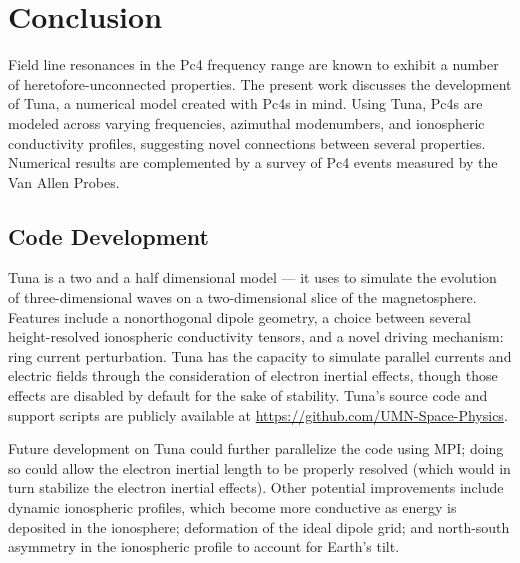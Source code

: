 


\chapter{Conclusion}
  \label{ch_conclusion}

Field line resonances in the Pc4 frequency range are known to exhibit a number
of heretofore-unconnected properties. The present work discusses the
development of Tuna, a numerical model created with Pc4s in mind. Using Tuna,
Pc4s are modeled across varying frequencies, azimuthal
modenumbers, and ionospheric conductivity profiles, suggesting novel
connections between several properties. Numerical results are complemented by a
survey of Pc4 events measured by the Van Allen Probes. 

\section{Code Development}

Tuna is a two and a half dimensional model --- it uses \maxeqs to simulate the
evolution of three-dimensional \Alfven waves on a two-dimensional slice of the
magnetosphere. Features include a nonorthogonal dipole geometry, a choice
between several height-resolved ionospheric conductivity tensors, and a novel
driving mechanism: ring current perturbation. Tuna has the capacity to simulate
parallel currents and electric fields through the consideration of electron
inertial effects, though those effects are disabled by default for the sake of
stability. Tuna's source code and support scripts are publicly available at
\url{https://github.com/UMN-Space-Physics}. 

Future development on Tuna could further parallelize the code using MPI; doing
so could allow the electron inertial length to be properly resolved (which
would in turn stabilize the electron inertial effects). Other potential
improvements include dynamic ionospheric profiles, which become more
conductive as energy is deposited in the ionosphere; deformation of the ideal
dipole grid; and north-south asymmetry in the ionospheric profile to account
for Earth's tilt. 



